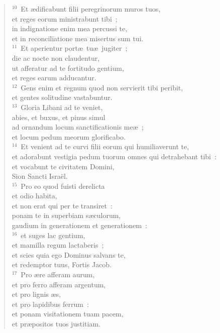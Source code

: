 \begin{verse}
${}^{10}$~Et \ae dificabunt filii peregrinorum muros tuos,\\ et reges eorum ministrabunt tibi~;\\ in indignatione enim mea percussi te,\\ et in reconciliatione mea misertus sum tui.\\
${}^{11}$~Et aperientur port\ae\ tu\ae\ jugiter~;\\ die ac nocte non claudentur,\\ ut afferatur ad te fortitudo gentium,\\ et reges earum adducantur.\\
${}^{12}$~Gens enim et regnum quod non servierit tibi peribit,\\ et gentes solitudine vastabuntur.\\
${}^{13}$~Gloria Libani ad te veniet,\\ abies, et buxus, et pinus simul\\ ad ornandum locum sanctificationis me\ae~;\\ et locum pedum meorum glorificabo.\\
${}^{14}$~Et venient ad te curvi filii eorum qui humiliaverunt te,\\ et adorabunt vestigia pedum tuorum omnes qui detrahebant tibi~:\\ et vocabunt te civitatem Domini,\\ Sion Sancti Isra\"el.\\
${}^{15}$~Pro eo quod fuisti derelicta\\ et odio habita,\\ et non erat qui per te transiret~:\\ ponam te in superbiam s\ae culorum,\\ gaudium in generationem et generationem~:\\
${}^{16}$~et suges lac gentium,\\ et mamilla regum lactaberis~;\\ et scies quia ego Dominus salvans te,\\ et redemptor tuus, Fortis Jacob.\\
${}^{17}$~Pro \ae re afferam aurum,\\ et pro ferro afferam argentum,\\ et pro lignis \ae s,\\ et pro lapidibus ferrum~:\\ et ponam visitationem tuam pacem,\\ et pr\ae positos tuos justitiam.\\

\end{verse}
